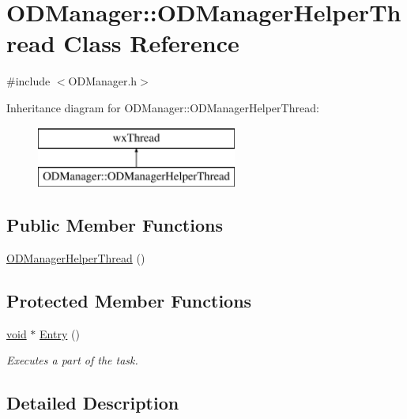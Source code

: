 \hypertarget{class_o_d_manager_1_1_o_d_manager_helper_thread}{}\section{O\+D\+Manager\+:\+:O\+D\+Manager\+Helper\+Thread Class Reference}
\label{class_o_d_manager_1_1_o_d_manager_helper_thread}


{\ttfamily \#include $<$O\+D\+Manager.\+h$>$}

Inheritance diagram for O\+D\+Manager\+:\+:O\+D\+Manager\+Helper\+Thread\+:\begin{figure}[H]
\begin{center}
\leavevmode
\includegraphics[height=2.000000cm]{class_o_d_manager_1_1_o_d_manager_helper_thread}
\end{center}
\end{figure}
\subsection*{Public Member Functions}
\begin{DoxyCompactItemize}
\item 
\hyperlink{class_o_d_manager_1_1_o_d_manager_helper_thread_a874501744bd1740b4aec3857918449e4}{O\+D\+Manager\+Helper\+Thread} ()
\end{DoxyCompactItemize}
\subsection*{Protected Member Functions}
\begin{DoxyCompactItemize}
\item 
\hyperlink{sound_8c_ae35f5844602719cf66324f4de2a658b3}{void} $\ast$ \hyperlink{class_o_d_manager_1_1_o_d_manager_helper_thread_a2fac140d7ec5667baea95a4c49721e1d}{Entry} ()
\begin{DoxyCompactList}\small\item\em Executes a part of the task. \end{DoxyCompactList}\end{DoxyCompactItemize}


\subsection{Detailed Description}


